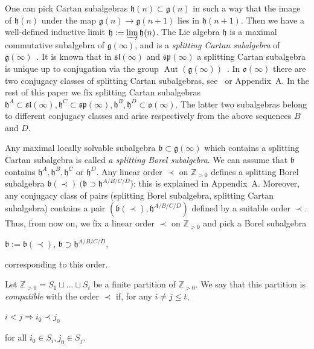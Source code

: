 \documentclass{emsprocart}
\begin{document}
One can pick Cartan subalgebras $\mathfrak h(n)\subset\mathfrak g(n)$ in such a way that the image of $\mathfrak h(n)$ under the map $\mathfrak g(n)\to\mathfrak g(n+1)$ lies in $\mathfrak h(n+1)$. Then we have a well-defined inductive limit $\mathfrak h:=\varinjlim \mathfrak h(n)$. The Lie algebra $\mathfrak h$ is a maximal commutative subalgebra of $\mathfrak g(\infty)$, and is a {\it splitting Cartan subalgebra} of $\mathfrak g(\infty)$~\cite{DPSn}. It is known that in $\mathfrak{sl}(\infty)$ and $\mathfrak{sp}(\infty)$ a splitting Cartan subalgebra is unique up to conjugation via the group $\operatorname{Aut}(\mathfrak g(\infty))$~\cite{DPSn}. In $\mathfrak o(\infty)$ there are two conjugacy classes of splitting Cartan subalgebras, see~\cite{DPSn} or Appendix~A. In the rest of this paper we fix splitting Cartan subalgebras $\mathfrak h^A\subset\mathfrak{sl}(\infty), \mathfrak h^C\subset\mathfrak{sp}(\infty), \mathfrak h^B, \mathfrak h^D\subset\mathfrak{o}(\infty)$. The latter two subalgebras belong to different conjugacy classes and arise respectively from the above sequences $B$ and $D$.

Any maximal locally solvable subalgebra $\mathfrak b\subset\mathfrak g(\infty)$ which contains a splitting Cartan subalgebra is called {\it a splitting Borel subalgebra}. We can assume that $\mathfrak b$ contains $\mathfrak h^A, \mathfrak h^B, \mathfrak h^C$ or $\mathfrak h^D$. Any linear order $\prec$ on $\mathbb Z_{>0}$ defines a splitting Borel subalgebra $\mathfrak b(\prec)~(\mathfrak b\supset\mathfrak h^{A/B/C/D}$): this is explained in Appendix~A. Moreover, any conjugacy class of pairs (splitting Borel subalgebra, splitting Cartan subalgebra) contains a pair $(\mathfrak b(\prec), \mathfrak h^{A/B/C/D})$ defined by a suitable order $\prec$. Thus, from now on, we fix a linear order $\prec$ on $\mathbb Z_{>0}$ and pick a Borel subalgebra \begin{center}$\mathfrak b:=\mathfrak b(\prec)$, $\mathfrak b\supset\mathfrak h^{A/B/C/D}$,\end{center} corresponding to this order.

Let $\mathbb Z_{>0}=S_1\sqcup ...\sqcup S_t$ be a finite partition of $\mathbb Z_{>0}$. We say that this partition is {\it compatible} with the order $\prec$ if, for any $i\ne j\le t$, \begin{center}$i<j\Rightarrow i_0\prec j_0$\end{center}for all $i_0 \in S_i, j_0\in S_j$.
\end{document}
